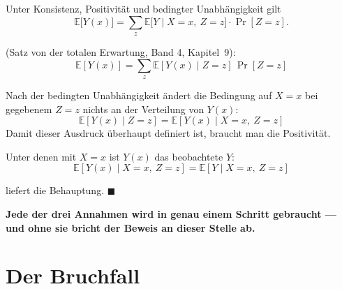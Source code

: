 \begin{merksatz}
Unter Konsistenz, Positivität und bedingter Unabhängigkeit gilt
\[ \mathbb{E}\bigl[Y(x)\bigr] = \sum_z \mathbb{E}\bigl[Y \mid X=x,\ Z=z\bigr]\cdot\Pr[Z=z] . \]

 (Satz von der totalen Erwartung, Band 4, Kapitel~9):
\[ \mathbb{E}[Y(x)] = \sum_z \mathbb{E}[Y(x) \mid Z=z]\,\Pr[Z=z] \]

 Nach der bedingten Unabhängigkeit ändert die Bedingung auf $X=x$ bei gegebenem $Z=z$ nichts an der Verteilung von $Y(x)$:
\[ \mathbb{E}[Y(x) \mid Z=z] = \mathbb{E}[Y(x) \mid X=x,\ Z=z] \]
Damit dieser Ausdruck überhaupt definiert ist, braucht man die Positivität.

 Unter denen mit $X=x$ ist $Y(x)$ das beobachtete $Y$:
\[ \mathbb{E}[Y(x) \mid X=x,\ Z=z] = \mathbb{E}[Y \mid X=x,\ Z=z] \]

 liefert die Behauptung. $\blacksquare$

\begin{center}
\begin{minipage}{0.9\textwidth}
\textbf{Jede der drei Annahmen wird in genau einem Schritt gebraucht --- und ohne sie bricht der Beweis an dieser Stelle ab.}
\end{minipage}
\end{center}

\begin{center}
\begin{minipage}{0.88\textwidth}
\end{minipage}
\end{center}
\end{merksatz}

\section{Der Bruchfall}

